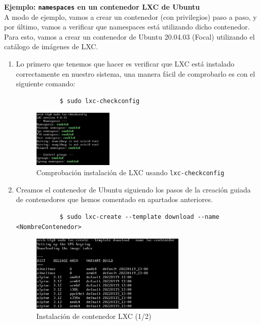 \documentclass[a4paper, oneside, 12pt]{book}
\begin{document}
	\pagebreak
	
	\noindent \textbf{\large Ejemplo: \texttt{namespaces} en un contenedor LXC de Ubuntu}\\
	
	\noindent A modo de ejemplo, vamos a crear un contenedor (con privilegios) paso a paso, y por último, vamos a verificar que namespaces está utilizando dicho contenedor. Para esto, vamos a crear un contenedor de Ubuntu 20.04.03 (Focal) utilizando el catálogo de imágenes de LXC.
	
	\begin{enumerate}
		\item Lo primero que tenemos que hacer es verificar que LXC está instalado correctamente en nuestro sistema, una manera fácil de comprobarlo es con el siguiente comando:
		\begin{verbatim}
			$ sudo lxc-checkconfig
		\end{verbatim}
	
		\begin{figure}[h!]
			\begin{center}
				\includegraphics[width=0.36\textwidth]{img/lxc_ns1.jpg}
				\caption{Comprobación instalación de LXC usando \texttt{lxc-checkconfig}}
			\end{center}
		\end{figure}
	
		\item Creamos el contenedor de Ubuntu siguiendo los pasos de la creación guiada de contenedores que hemos comentado en apartados anteriores.
		\begin{verbatim}
			$ sudo lxc-create --template download --name <NombreContenedor>
		\end{verbatim}
		
		\begin{figure}[h!]
			\begin{center}
				\includegraphics[width=0.7\textwidth]{img/lxc_ns2.png}
				\caption{Instalación de contenedor LXC (1/2)}
			\end{center}
		\end{figure}
		

\end{enumerate}
\end{document}
